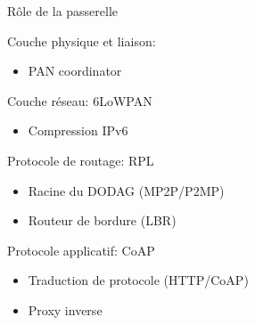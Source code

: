 \begin{frame}{Rôle de la passerelle}
  \begin{block}{Couche physique et liaison: \ieee{}}
    \begin{itemize}
      \item PAN coordinator
    \end{itemize}
  \end{block}
  \begin{block}{Couche réseau: 6LoWPAN}
    \begin{itemize}
      \item Compression IPv6
    \end{itemize}
  \end{block}
  \begin{alertblock}{Protocole de routage: RPL}
    \begin{itemize}
      \item Racine du DODAG (MP2P/P2MP)
      \item Routeur de bordure (LBR)
    \end{itemize}
  \end{alertblock}
  \begin{alertblock}{Protocole applicatif: CoAP}
    \begin{itemize}
      \item Traduction de protocole (HTTP/CoAP)
      \item Proxy inverse
    \end{itemize}
  \end{alertblock}
\end{frame}


